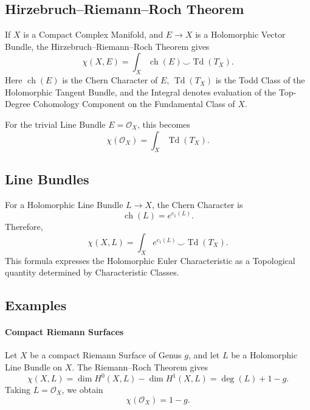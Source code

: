\documentclass[a4paper, 10pt, onepage]{elegantbook}
\begin{document}
{\subsection{Hirzebruch--Riemann--Roch Theorem}

If \(X\) is a Compact Complex Manifold, and \(E\to X\) is a Holomorphic Vector Bundle, the Hirzebruch--Riemann--Roch 
Theorem gives
\begin{equation}
\boxed{
\chi(X,E)
=
\int_X
\operatorname{ch}(E)\smile\operatorname{Td}(T_X).
}
\end{equation}
Here \(\operatorname{ch}(E)\) is the Chern Character of \(E\), \(\operatorname{Td}(T_X)\) is the Todd Class of the 
Holomorphic Tangent Bundle, and the Integral denotes evaluation of the Top-Degree Cohomology Component on the 
Fundamental Class of \(X\).

For the trivial Line Bundle \(E=\mathcal{O}_X\), this becomes
\begin{equation}
\chi(\mathcal{O}_X)
=
\int_X \operatorname{Td}(T_X).
\end{equation}

\subsection{Line Bundles}

For a Holomorphic Line Bundle \(L\to X\), the Chern Character is
\[
\operatorname{ch}(L)=e^{c_1(L)}.
\]
Therefore,
\begin{equation}
\chi(X,L)
=
\int_X e^{c_1(L)}\smile\operatorname{Td}(T_X).
\end{equation}
This formula expresses the Holomorphic Euler Characteristic as a
Topological quantity determined by Characteristic Classes.

\subsection{Examples}

\paragraph{Compact Riemann Surfaces}

Let \(X\) be a compact Riemann Surface of Genus \(g\), and let \(L\) be a Holomorphic Line Bundle on \(X\). The 
Riemann--Roch Theorem gives
\begin{equation}
\chi(X,L)
=
\dim H^0(X,L)-\dim H^1(X,L)
=
\deg(L)+1-g.
\end{equation}
Taking \(L=\mathcal{O}_X\), we obtain
\begin{equation}
\chi(\mathcal{O}_X)=1-g.
\end{equation}

}
\end{document}
